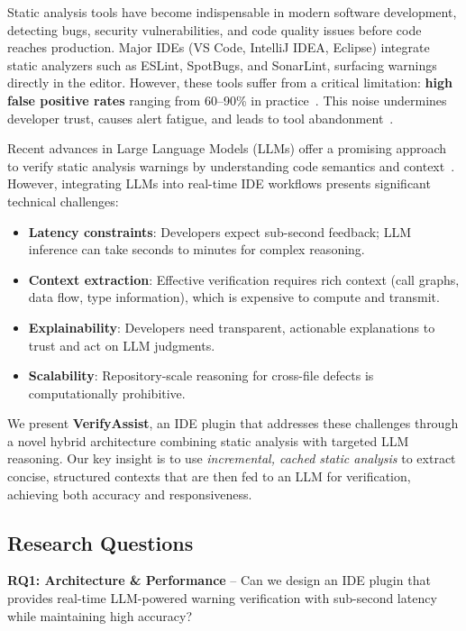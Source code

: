 \documentclass[conference]{IEEEtran}
\begin{document}
Static analysis tools have become indispensable in modern software development, detecting bugs, security vulnerabilities, and code quality issues before code reaches production. Major IDEs (VS Code, IntelliJ IDEA, Eclipse) integrate static analyzers such as ESLint, SpotBugs, and SonarLint, surfacing warnings directly in the editor. However, these tools suffer from a critical limitation: \textbf{high false positive rates} ranging from 60--90\% in practice~\cite{johnson2013don, christakis2016developers}. This noise undermines developer trust, causes alert fatigue, and leads to tool abandonment~\cite{smith2020johnny}.

Recent advances in Large Language Models (LLMs) offer a promising approach to verify static analysis warnings by understanding code semantics and context~\cite{li2024llm, yan2024better}. However, integrating LLMs into real-time IDE workflows presents significant technical challenges:

\begin{itemize}
\item \textbf{Latency constraints}: Developers expect sub-second feedback; LLM inference can take seconds to minutes for complex reasoning.
\item \textbf{Context extraction}: Effective verification requires rich context (call graphs, data flow, type information), which is expensive to compute and transmit.
\item \textbf{Explainability}: Developers need transparent, actionable explanations to trust and act on LLM judgments.
\item \textbf{Scalability}: Repository-scale reasoning for cross-file defects is computationally prohibitive.
\end{itemize}

We present \textbf{VerifyAssist}, an IDE plugin that addresses these challenges through a novel hybrid architecture combining static analysis with targeted LLM reasoning. Our key insight is to use \textit{incremental, cached static analysis} to extract concise, structured contexts that are then fed to an LLM for verification, achieving both accuracy and responsiveness.

\subsection{Research Questions}

\textbf{RQ1: Architecture \& Performance} -- Can we design an IDE plugin that provides real-time LLM-powered warning verification with sub-second latency while maintaining high accuracy?
\end{document}

